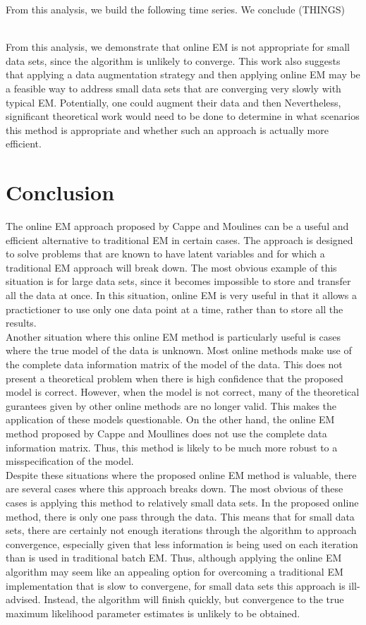 \documentclass[12pt]{article}
\begin{document}
From this analysis, we build the following time series. We conclude (THINGS) \\\


From this analysis, we demonstrate that online EM is not appropriate for small data sets, since the algorithm is unlikely to converge. This work also suggests that applying a data augmentation strategy and then applying online EM may be a feasible way to address small data sets that are converging very slowly with typical EM. Potentially, one could augment their data and then  Nevertheless, significant theoretical work would need to be done to determine in what scenarios this method is appropriate and whether such an approach is actually more efficient.

\newpage
\section{Conclusion}
The online EM approach proposed by Cappe and Moulines can be a useful and efficient alternative to traditional EM in certain cases. The approach is designed to solve problems that are known to have latent variables and for which a traditional EM approach will break down. The most obvious example of this situation is for large data sets, since it becomes impossible to store and transfer all the data at once. In this situation, online EM is very useful in that it allows a practictioner to use only one data point at a time, rather than to store all the results. \\

Another situation where this online EM method is particularly useful is cases where the true model of the data is unknown. Most online methods make use of the complete data information matrix of the model of the data. This does not present a theoretical problem when there is high confidence that the proposed model is correct. However, when the model is not correct, many of the theoretical gurantees given by other online methods are no longer valid. This makes the application of these models questionable. On the other hand, the online EM method proposed by Cappe and Moullines does not use the complete data information matrix. Thus, this method is likely to be much more robust to a misspecification of the model. \\

Despite these situations where the proposed online EM method is valuable, there are several cases where this approach breaks down. The most obvious of these cases is applying this method to relatively small data sets. In the proposed online method, there is only one pass through the data. This means that for small data sets, there are certainly not enough iterations through the algorithm to approach convergence, especially given that less information is being used on each iteration than is used in traditional batch EM. Thus, although applying the online EM algorithm may seem like an appealing option for overcoming a traditional EM implementation that is slow to convergene, for small data sets this approach is ill-advised. Instead, the algorithm will finish quickly, but convergence to the true maximum likelihood parameter estimates is unlikely to be obtained.\\
\end{document}
